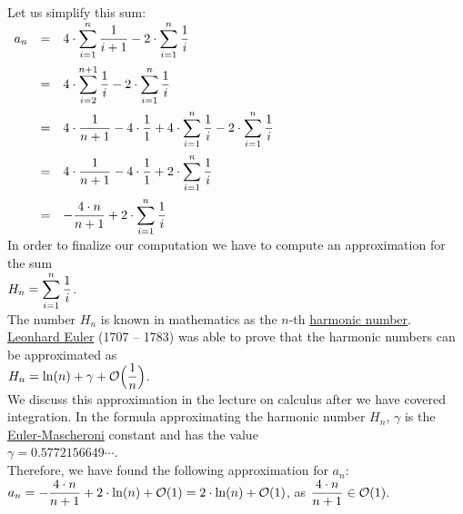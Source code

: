 \\[0.2cm]
Let us simplify this sum:
\\[0.2cm]
\hspace*{1.3cm}
$
\begin{array}{lcl}
 a_{n} & = & \displaystyle 4 \cdot \sum_{i=1}^n \frac{1}{i+1} - 2 \cdot \sum_{i=1}^n \frac{1}{i} \\[0.5cm]
       & = & \displaystyle 4 \cdot \sum_{i=2}^{n+1} \frac{1}{i} - 2 \cdot \sum_{i=1}^n \frac{1}{i} \\[0.5cm]
       & = & \displaystyle 4 \cdot \frac{1}{n+1} - 4 \cdot \frac{1}{1} + 4 \cdot \sum_{i=1}^{n} \frac{1}{i} - 2 \cdot \sum_{i=1}^n \frac{1}{i} \\[0.5cm]
       & = & \displaystyle 4 \cdot \frac{1}{n+1} - 4 \cdot \frac{1}{1} + 2 \cdot \sum_{i=1}^{n} \frac{1}{i}  \\[0.5cm]
       & = & \displaystyle - \frac{4 \cdot n}{n+1}  + 2 \cdot \sum_{i=1}^{n} \frac{1}{i}  
\end{array}
$
\\[0.2cm]
In order to finalize our computation we have to compute an approximation for the sum
\\[0.2cm]
\hspace*{1.3cm}
$H_n = \displaystyle\sum\limits_{i=1}^{n}\frac{1}{i}$.
\\[0.2cm] 
The number $H_n$ is known in mathematics as the $n$-th 
\href{http://en.wikipedia.org/wiki/Harmonic_number}{harmonic number}.
\href{http://en.wikipedia.org/wiki/Leonhard_Euler}{Leonhard Euler} (1707 -- 1783) was able to prove
that the harmonic numbers can be approximated as
\\[0.2cm]
\hspace*{1.3cm}
$\displaystyle H_n = \ln(n) + \gamma + \mathcal{O}\Bigl(\frac{1}{n}\Bigr)$. 
\\[0.2cm] 
We discuss this approximation in the lecture on calculus after we have covered integration.  In the
formula approximating the harmonic number $H_n$, $\gamma$ is the
\href{http://en.wikipedia.org/wiki/Euler-Mascheroni_constant}{Euler-Mascheroni} constant and has the 
value
\\[0.2cm]
\hspace*{1.3cm}
$\gamma = 0.5772156649 \cdots$.
\\[0.2cm]
Therefore, we have found the following approximation for $a_n$:
\\[0.2cm]
\hspace*{1.3cm}
$\displaystyle a_n = - \frac{4 \cdot n}{n+1}  + 2 \cdot \ln(n) + \mathcal{O}(1) =  2 \cdot \ln(n) + \mathcal{O}(1)$,
\quad as \quad $\displaystyle \frac{4 \cdot n}{n+1} \in \mathcal{O}(1)$.
\\[0.2cm]
